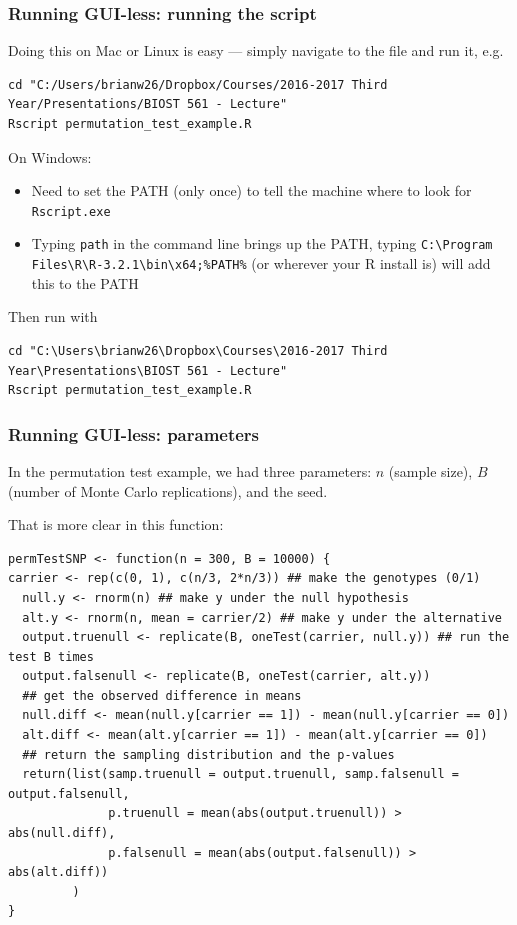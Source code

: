 \documentclass[12pt, 
hyperref={colorlinks=true, linkcolor=blue, urlcolor=cyan}]{beamer}
\begin{document}
\begin{frame}[fragile]
\frametitle{Running GUI-less: running the script}
Doing this on Mac or Linux is easy --- simply navigate to the file and run it, e.g.{\tiny
\begin{verbatim}
cd "C:/Users/brianw26/Dropbox/Courses/2016-2017 Third Year/Presentations/BIOST 561 - Lecture"
Rscript permutation_test_example.R
\end{verbatim}
}
On Windows:
\begin{itemize}
\item Need to set the PATH (only once) to tell the machine where to look for \texttt{Rscript.exe}
\item Typing \texttt{path} in the command line brings up the PATH, typing
{\scriptsize \texttt{C:\textbackslash Program Files\textbackslash R\textbackslash R-3.2.1\textbackslash bin\textbackslash x64;\%PATH\%} } (or wherever your R install is) will add this to the PATH
\end{itemize}
Then run with 
{\tiny
\begin{verbatim}
cd "C:\Users\brianw26\Dropbox\Courses\2016-2017 Third Year\Presentations\BIOST 561 - Lecture"
Rscript permutation_test_example.R
\end{verbatim}
}
\end{frame}


\begin{frame}[fragile]
\frametitle{Running GUI-less: parameters}
In the permutation test example, we had three parameters: $n$ (sample size), $B$ (number of Monte Carlo replications), and the seed.

That is more clear in this function:
{\scriptsize
\begin{verbatim}
permTestSNP <- function(n = 300, B = 10000) {
carrier <- rep(c(0, 1), c(n/3, 2*n/3)) ## make the genotypes (0/1)
  null.y <- rnorm(n) ## make y under the null hypothesis
  alt.y <- rnorm(n, mean = carrier/2) ## make y under the alternative 
  output.truenull <- replicate(B, oneTest(carrier, null.y)) ## run the test B times
  output.falsenull <- replicate(B, oneTest(carrier, alt.y))
  ## get the observed difference in means
  null.diff <- mean(null.y[carrier == 1]) - mean(null.y[carrier == 0])
  alt.diff <- mean(alt.y[carrier == 1]) - mean(alt.y[carrier == 0])
  ## return the sampling distribution and the p-values
  return(list(samp.truenull = output.truenull, samp.falsenull = output.falsenull,
              p.truenull = mean(abs(output.truenull)) > abs(null.diff),
              p.falsenull = mean(abs(output.falsenull)) > abs(alt.diff))
         )
}
\end{verbatim}
}
\end{frame}
\end{document}
